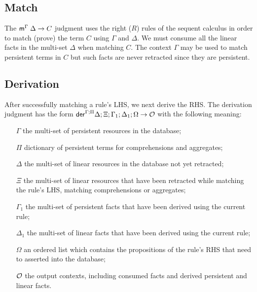 

\subsection{Match}

The $\mathsf{m}^{\Gamma} \; \Delta \rightarrow C$ judgment uses the right ($R$) rules of the sequent
calculus in order to match (prove) the term $C$ using $\Gamma$ and $\Delta$. We
must consume all the linear facts in the multi-set $\Delta$ when matching $C$.
The context $\Gamma$ may be used to match persistent terms in $C$ but such facts
are never retracted since they are persistent.



\subsection{Derivation}

After successfully matching a rule's LHS, we next derive the RHS.  The
derivation judgment has the form
$\mathsf{der}^{\Gamma ; \Pi} \Delta ; \Xi; \Gamma_1; \Delta_1; \Omega \rightarrow \mathcal{O}$ with the
following meaning:

\begin{enumerate}

   \item[$\Gamma$] the multi-set of persistent resources in the database;
   
   \item[$\Pi$] dictionary of persistent terms for comprehensions and
   aggregates;

   \item[$\Delta$] the multi-set of linear resources in the database not yet
   retracted;

   \item[$\Xi$] the multi-set of linear resources that have been retracted while
   matching the rule's LHS, matching comprehensions or aggregates;

   \item[$\Gamma_1$] the multi-set of persistent facts that have been derived
   using the current rule;

   \item[$\Delta_1$] the multi-set of linear facts that have been derived using
   the current rule;


   \item[$\Omega$] an ordered list which contains the propositions of the rule's RHS
      that need to asserted into the database;

   \item[$\mathcal{O}$] the output contexts, including consumed facts and derived
   persistent and linear facts.

\end{enumerate}

